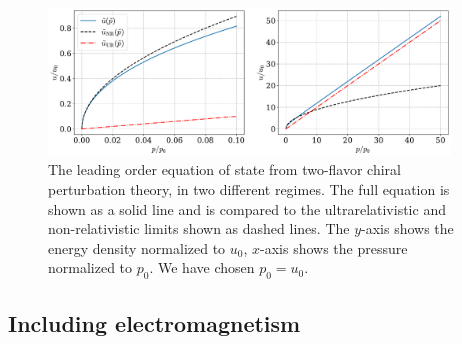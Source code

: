 \begin{figure}[!htb]
    \centering
    \includegraphics[width=0.95\textwidth]{../scripts/figurer/pion_star/pion_eos.pdf}
    \caption{
        The leading order equation of state from two-flavor chiral perturbation theory, in two different regimes.
        The full equation is shown as a solid line and is compared to the ultrarelativistic and non-relativistic limits shown as dashed lines. 
        The $y$-axis shows the energy density normalized to $u_0$, $x$-axis shows the pressure normalized to $p_0$.
        We have chosen $p_0 = u_0$.
    }
    \label{fig: equation of state pions}
\end{figure}



\subsection{Including electromagnetism}
\label{subsection: including electromagnetism lo eos}


